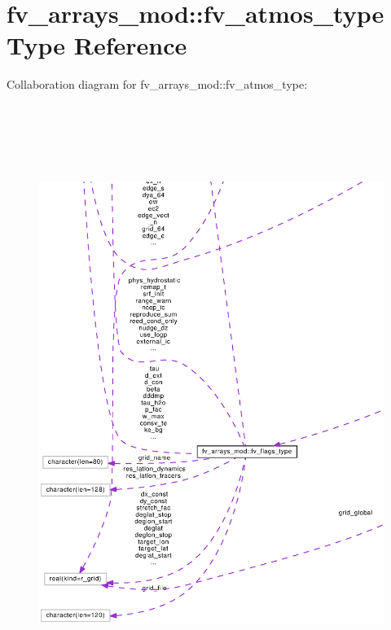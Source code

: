 \section{fv\-\_\-arrays\-\_\-mod\-:\-:fv\-\_\-atmos\-\_\-type Type Reference}
\label{structfv__arrays__mod_1_1fv__atmos__type}


Collaboration diagram for fv\-\_\-arrays\-\_\-mod\-:\-:fv\-\_\-atmos\-\_\-type\-:
\nopagebreak
\begin{figure}[H]
\begin{center}
\leavevmode
\includegraphics[height=550pt]{structfv__arrays__mod_1_1fv__atmos__type__coll__graph}
\end{center}
\end{figure}
